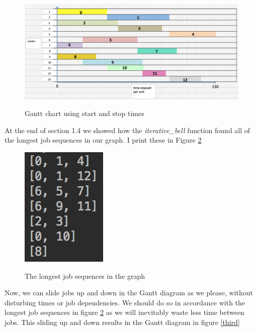 \documentclass[paper=a4, fontsize=12pt]{scrartcl} %
\numberwithin{equation}{section}       %
\numberwithin{figure}{section}         %
\numberwithin{table}{section}          %
\begin{document}
\begin{figure}[h]
\caption{Gantt chart using start and stop times}
\centering
\includegraphics[scale=0.55]{final1}\label{first}
\end{figure}

At the end of section 1.4 we showed how the \textit{iterative\_bell} function found all of the longest job sequences in our graph. I print these in Figure \ref{second}

\begin{figure}[h]
\caption{The longest job sequences in the graph}
\centering
\includegraphics[scale=0.9]{longest}\label{second}
\end{figure}

Now, we can slide jobs up and down in the Gantt diagram as we please, without disturbing times or job dependencies. We should do so in accordance with the longest job sequences in figure \ref{second} as we will inevitably waste less time between jobs. This sliding up and down results in the Gantt diagram in figure \ref{third}
\end{document}

